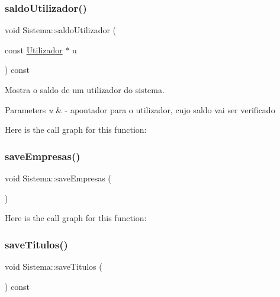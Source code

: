 \mbox{\label{class_sistema_aabeb8de1cc79bff9ff04d190ac3754d2}} 
\subsubsection{\texorpdfstring{saldo\+Utilizador()}{saldoUtilizador()}}
{\footnotesize\ttfamily void Sistema\+::saldo\+Utilizador (\begin{DoxyParamCaption}\item[{const \mbox{\hyperlink{class_utilizador}{Utilizador}} $\ast$}]{u }\end{DoxyParamCaption}) const}



Mostra o saldo de um utilizador do sistema. 


\begin{DoxyParams}{Parameters}
{\em u} & -\/ apontador para o utilizador, cujo saldo vai ser verificado \\
\hline
\end{DoxyParams}
Here is the call graph for this function\+:
\mbox{\label{class_sistema_ada4619fbedcb5a07d807545caebd5c57}} 
\subsubsection{\texorpdfstring{save\+Empresas()}{saveEmpresas()}}
{\footnotesize\ttfamily void Sistema\+::save\+Empresas (\begin{DoxyParamCaption}{ }\end{DoxyParamCaption})}

Here is the call graph for this function\+:
\mbox{\label{class_sistema_a07ff0877985ee60035abb90a60c458d8}} 
\subsubsection{\texorpdfstring{save\+Titulos()}{saveTitulos()}}
{\footnotesize\ttfamily void Sistema\+::save\+Titulos (\begin{DoxyParamCaption}{ }\end{DoxyParamCaption}) const}



